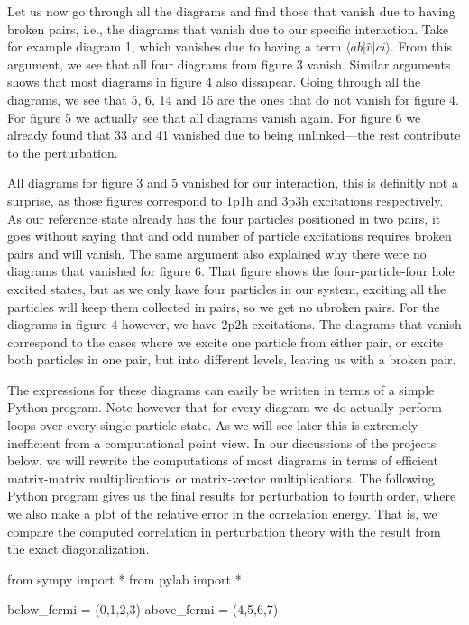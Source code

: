 \documentclass[%
twoside,                 %
final,                   %
10pt]{article}
\newenvironment{doconceexercise}{}{}
\begin{document}
\begin{doconceexercise}
Let us now go through all the diagrams and find those that vanish due
to having broken pairs, i.e., the diagrams that vanish due to our
specific interaction. Take for example diagram 1, which vanishes due
to having a term $\langle ab\vert \hat{v} \vert ci\rangle$. From this
argument, we see that all four diagrams from figure 3 vanish. Similar
arguments shows that most diagrams in figure 4 also dissapear. Going
through all the diagrams, we see that 5, 6, 14 and 15 are the ones
that do not vanish for figure 4. For figure 5 we actually see that all
diagrams vanish again. For figure 6 we already found that 33 and 41
vanished due to being unlinked---the rest contribute to the
perturbation.

All diagrams for figure 3 and 5 vanished for our interaction, this is
definitly not a surprise, as those figures correspond to 1p1h and 3p3h
excitations respectively. As our reference state already has the four
particles positioned in two pairs, it goes without saying that and odd
number of particle excitations requires broken pairs and will
vanish. The same argument also explained why there were no diagrams
that vanished for figure 6. That figure shows the four-particle-four
hole excited states, but as we only have four particles in our system,
exciting all the particles will keep them collected in pairs, so we
get no ubroken pairs. For the diagrams in figure 4 however, we have
2p2h excitations. The diagrams that vanish correspond to the cases
where we excite one particle from either pair, or excite both
particles in one pair, but into different levels, leaving us with a
broken pair.

The expressions for these diagrams can easily be written in terms of a
simple Python program. Note however that for every diagram we do
actually perform loops over every single-particle state. As we will
see later this is extremely inefficient from a computational point
view. In our discussions of the projects below, we will rewrite the
computations of most diagrams in terms of efficient matrix-matrix
multiplications or matrix-vector multiplications.  The following
Python program gives us the final results for perturbation to fourth
order, where we also make a plot of the relative error in the
correlation energy. That is, we compare the computed correlation in
perturbation theory with the result from the exact diagonalization.

\bpypro
from sympy import *
from pylab import *

below_fermi = (0,1,2,3)
above_fermi = (4,5,6,7)


\end{doconceexercise}
\end{document}
